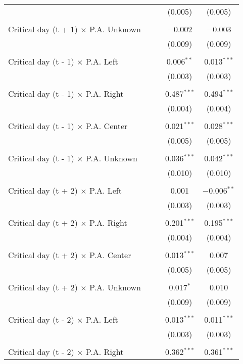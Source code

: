 \documentclass[
]{article}
\begin{document}
\begin{table}[!htbp]
{\begin{tabular}{@{\extracolsep{5pt}}lcccc}
  &  &  & (0.005) & (0.005) \\ 
  & & & & \\ 
 Critical day (t + 1) $\times$ P.A. Unknown &  &  & $-$0.002 & $-$0.003 \\ 
  &  &  & (0.009) & (0.009) \\ 
  & & & & \\ 
 Critical day (t - 1) $\times$ P.A. Left &  &  & 0.006$^{**}$ & 0.013$^{***}$ \\ 
  &  &  & (0.003) & (0.003) \\ 
  & & & & \\ 
 Critical day (t - 1) $\times$ P.A. Right &  &  & 0.487$^{***}$ & 0.494$^{***}$ \\ 
  &  &  & (0.004) & (0.004) \\ 
  & & & & \\ 
 Critical day (t - 1) $\times$ P.A. Center &  &  & 0.021$^{***}$ & 0.028$^{***}$ \\ 
  &  &  & (0.005) & (0.005) \\ 
  & & & & \\ 
 Critical day (t - 1) $\times$ P.A. Unknown &  &  & 0.036$^{***}$ & 0.042$^{***}$ \\ 
  &  &  & (0.010) & (0.010) \\ 
  & & & & \\ 
 Critical day (t + 2) $\times$ P.A. Left &  &  & 0.001 & $-$0.006$^{**}$ \\ 
  &  &  & (0.003) & (0.003) \\ 
  & & & & \\ 
 Critical day (t + 2) $\times$ P.A. Right &  &  & 0.201$^{***}$ & 0.195$^{***}$ \\ 
  &  &  & (0.004) & (0.004) \\ 
  & & & & \\ 
 Critical day (t + 2) $\times$ P.A. Center &  &  & 0.013$^{***}$ & 0.007 \\ 
  &  &  & (0.005) & (0.005) \\ 
  & & & & \\ 
 Critical day (t + 2) $\times$ P.A. Unknown &  &  & 0.017$^{*}$ & 0.010 \\ 
  &  &  & (0.009) & (0.009) \\ 
  & & & & \\ 
 Critical day (t - 2) $\times$ P.A. Left &  &  & 0.013$^{***}$ & 0.011$^{***}$ \\ 
  &  &  & (0.003) & (0.003) \\ 
  & & & & \\ 
 Critical day (t - 2) $\times$ P.A. Right &  &  & 0.362$^{***}$ & 0.361$^{***}$ \\ 

\end{tabular}}
\end{table}
\end{document}

